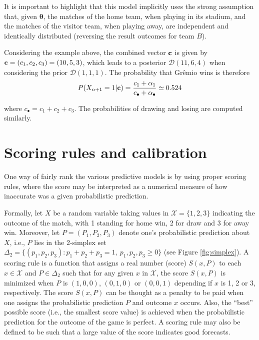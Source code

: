 \documentclass[journal,article,accept,moreauthors,pdftex,12pt,a4paper]{mdpi}
\begin{document}
    It is important to highlight that this model implicitly uses the strong assumption that, given $\boldsymbol{\theta}$, the matches of the home team, when playing in its stadium, and the matches of the visitor team, when playing away, are independent and identically distributed (reversing the result outcomes for team $B$).

    Considering the example above, the combined vector ${\bf c}$ is given by ${\bf c}=(c_1,c_2,c_3)=(10,5,3)$, which leads to a posterior $\mathcal{D}(11,6,4)$ when considering the prior $\mathcal{D}(1,1,1)$.
    The probability that Gr\^emio wins is therefore
    \[P(X_{n+1}=1|{\bf c})=\frac{c_1+\alpha_1}{c_{\bullet}+\alpha_{\bullet}}\simeq0.524
    \]

    \noindent
    where $c_{\bullet}=c_1+c_2+c_3$. The probabilities of drawing and losing are computed similarly.

    \section{Scoring rules and calibration}
    \label{sec::scoring}

    One way of fairly rank the various predictive models is by using proper scoring rules, where
    the score may be interpreted as a numerical measure of how inaccurate was a given probabilistic prediction.

    Formally, let $X$ be a random variable
    taking values in $\mathcal{X}=\{1,2,3\}$ indicating
    the outcome of the match, with 1 standing for home win, 2 for draw and 3 for away win.  Moreover, let $P=(P_1,P_2,P_3)$ denote one's probabilistic prediction
    about $X$, i.e., $P$ lies in the 2-simplex set $\Delta_2=\{(p_1,p_2,p_3):p_1+p_2+p_3=1, \ p_1,p_2,p_3\geq0\}$ (see Figure
    \ref{fig:simplex}).
    A scoring rule is a function
    that assigns a real number (score) $S(x,P)$ to each $x \in \mathcal{X}$
    and $P \in \Delta_2$
    such that
    for any given $x$ in $\mathcal{X}$, the score  $S(x,P)$ is minimized when $P$ is
    $(1,0,0)$, $(0,1,0)$ or $(0,0,1)$ depending if $x$ is 1, 2 or 3, respectively.
    The score $S(x,P)$ can be thought as
    a penalty to be paid when one assigns the
    probabilistic prediction $P$ and outcome
    $x$ occurs. Also, the ``best'' possible score (i.e., the smallest score value) is achieved when the probabilistic prediction for the outcome of the game is perfect. A scoring rule may also be defined to be such that a large value of the score indicates good forecasts.
\end{document}
